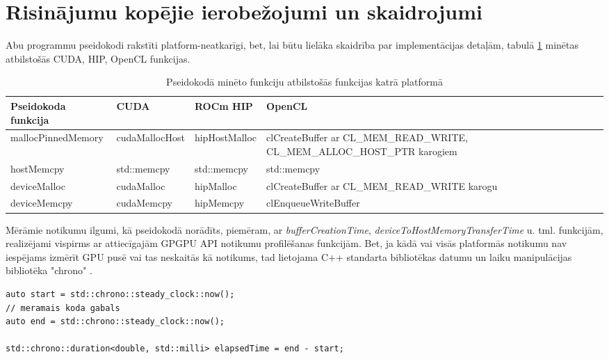 \section{Risinājumu kopējie ierobežojumi un skaidrojumi}
Abu programmu pseidokodi rakstīti platform-neatkarīgi, bet, lai būtu lielāka
skaidrība par implementācijas detaļām, tabulā
\ref{tab:pseudocode_representations} minētas atbilstošās CUDA, HIP, OpenCL
funkcijas.

\begin{table}[!ht]
\caption{Pseidokodā minēto funkciju atbilstošās funkcijas katrā platformā}
\label{tab:pseudocode_representations} 
\begin{tabularx}{\textwidth}{
  >{\raggedright\arraybackslash}p{}
  >{\raggedright\arraybackslash}p{}
  >{\raggedright\arraybackslash}p{}
  >{\raggedright\arraybackslash}p{}
}
\hline
\textbf{Pseidokoda funkcija} & \textbf{CUDA} & \textbf{ROCm HIP} & \textbf{OpenCL} \\ \hline
mallocPinnedMemory & cudaMallocHost & hipHostMalloc & clCreateBuffer ar CL\_MEM\_READ\_WRITE, CL\_MEM\_ALLOC\_HOST\_PTR karogiem \\ \hline
hostMemcpy & std::memcpy & std::memcpy & std::memcpy \\ \hline
deviceMalloc & cudaMalloc & hipMalloc & clCreateBuffer ar CL\_MEM\_READ\_WRITE karogu \\ \hline
deviceMemcpy & cudaMemcpy & hipMemcpy & clEnqueueWriteBuffer \\
\hline
\end{tabularx}
\end{table}

Mērāmie notikumu ilgumi, kā pseidokodā norādīts, piemēram, ar
\textit{bufferCreationTime}, \textit{deviceToHostMemoryTransferTime} u. tml.
funkcijām, realizējami vispirms ar attiecīgajām GPGPU API notikumu profilēšanas
funkcijām. Bet, ja kādā vai visās platformās notikumu nav iespējams izmērīt GPU
pusē vai tas neskaitās kā notikums, tad lietojama C++ standarta bibliotēkas
datumu un laiku manipulācijas bibliotēka "chrono" \cite{std_chrono}.

\begin{lstlisting}[caption={"chrono" laika mērīšanas piemērs},
    captionpos=b,
    label=lst:chrono_example]
auto start = std::chrono::steady_clock::now();
// meramais koda gabals
auto end = std::chrono::steady_clock::now();

std::chrono::duration<double, std::milli> elapsedTime = end - start;
\end{lstlisting}

